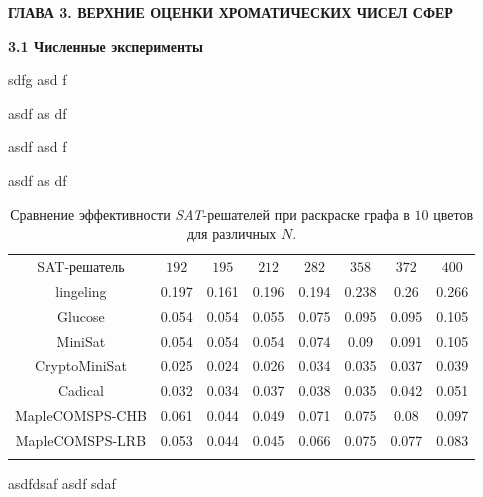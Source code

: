 \newpage
\begin{center}
\noindent\textbf{ГЛАВА 3. ВЕРХНИЕ ОЦЕНКИ ХРОМАТИЧЕСКИХ ЧИСЕЛ СФЕР}\label{chapters:3}
\vspace{1.5mm}
\end{center}

\vspace{5pt}
\textbf{3.1 Численные эксперименты}\label{chapters:3.1}
\vspace{5pt}

sdfg asd f


asdf as df


asdf asd f


asdf as df

\begin{table}[h]
\centering
\captionsetup{justification=centering}
\caption{Сравнение эффективности \textit{SAT}-решателей при раскраске графа в $10$ цветов для различных $N$.} 
\label{chapter3:tab:color10}
\begin{tabular}{@{}|c|c|c|c|c|c|c|c|} 
\Xhline{4\arrayrulewidth}
SAT-решатель          & $192$ & $195$ & $212$ & $282$ & $358$ & $372$ & $400$ \\ \Xhline{4\arrayrulewidth}
lingeling             & 0.197 & 0.161 & 0.196 & 0.194 & 0.238 & 0.26  & 0.266 \\ \hline
Glucose               & 0.054 & 0.054 & 0.055 & 0.075 & 0.095 & 0.095 & 0.105 \\ \hline
MiniSat               & 0.054 & 0.054 & 0.054 & 0.074 & 0.09  & 0.091 & 0.105 \\ \hline
CryptoMiniSat         & 0.025 & 0.024 & 0.026 & 0.034 & 0.035 & 0.037 & 0.039 \\ \hline
Cadical               & 0.032 & 0.034 & 0.037 & 0.038 & 0.035 & 0.042 & 0.051 \\ \hline
MapleCOMSPS-CHB       & 0.061 & 0.044 & 0.049 & 0.071 & 0.075 & 0.08  & 0.097 \\ \hline
MapleCOMSPS-LRB       & 0.053 & 0.044 & 0.045 & 0.066 & 0.075 & 0.077 & 0.083 \\ \Xhline{4\arrayrulewidth}
\end{tabular}
\end{table}

asdfdsaf
asdf
sdaf


